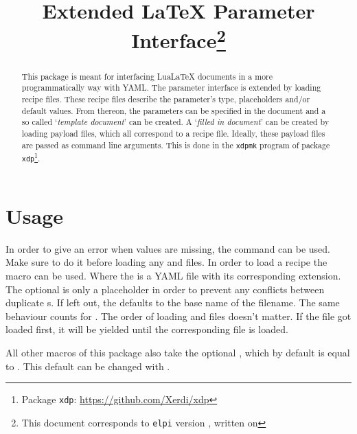 \documentclass{ltxdoc}
\begin{document}
    \title{Extended \LaTeX{} Parameter Interface\thanks{This document corresponds to \texttt{elpi} version \gitversion, written on \gitdate}}
    \maketitle

    \begin{abstract}
        This package is meant for interfacing Lua\LaTeX{} documents in a more programmatically way with YAML\@.
        The parameter interface is extended by loading recipe files.
        These recipe files describe the parameter's type, placeholders and/or default values.
        From thereon, the parameters can be specified in the document and a so called `\textit{template document}' can be created.
        A `\textit{filled in document}' can be created by loading payload files, which all correspond to a recipe file.
        Ideally, these payload files are passed as command line arguments.
        This is done in the \texttt{xdpmk} program of package \texttt{xdp}\footnote{Package \texttt{xdp}: \url{https://github.com/Xerdi/xdp}}.
    \end{abstract}

    \section{Usage}
    \DescribeMacro{\strictparams} In order to give an error when values are missing, the \cmd{\strictparams} command can be used.
    Make sure to do it before loading any  and  files.
    \DescribeMacro{\loadrecipe}
    In order to load a recipe the macro \cmd{\loadrecipe} can be used.
    Where the  is a YAML file with its corresponding extension.
    The optional  is only a placeholder in order to prevent any conflicts between duplicate s.
    If left out, the  defaults to the base name of the filename.
    \DescribeMacro{\loadpayload} The same behaviour counts for \cmd{\loadpayload}.
    The order of loading  and  files doesn't matter.
    If the  file got loaded first, it will be yielded until the corresponding  file is loaded.

    All other macros of this package also take the optional , which by default is equal to \cmd{\jobname}.
    \DescribeMacro{\setnamespace} This default  can be changed with \cmd{\setnamespace}.
\end{document}
